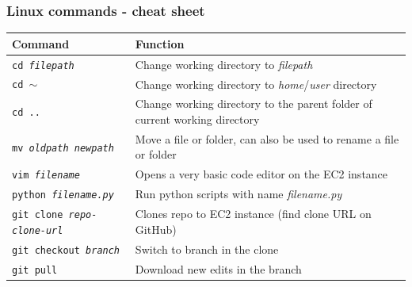 \documentclass[aspectratio=169]{beamer} %
\begin{document}
\begin{frame}
	\frametitle{Linux commands - cheat sheet}
	\vspace{-.6cm}
	\begin{table}
		\begin{tabular}{p{}p{}}
			Command & Function \\
			\hline \hline
			\texttt{cd \textit{filepath}}
			  & Change working directory to \textit{filepath}  \\
			\texttt{cd $\sim$}
			  & Change working directory to \textit{home}/\textit{user} directory \\
			\texttt{cd ..}
			  & Change working directory to the parent folder of current working directory \\
			\texttt{mv \textit{oldpath} \textit{newpath}}
			  & Move a file or folder, can also be used to rename a file or folder \\
			\texttt{vim \textit{filename}}
			  & Opens a very basic code editor on the EC2 instance \\
			\texttt{python \textit{filename.py}}
			  & Run python scripts with name \textit{filename.py} \\
			\texttt{git clone \textit{repo-clone-url}}
			  & Clones repo to EC2 instance (find clone URL on GitHub) \\
			\texttt{git checkout \textit{branch}}
			  & Switch to branch in the clone\\
			\texttt{git pull}
			  & Download new edits in the branch  \\
		\end{tabular}
	\end{table}
\end{frame}
\end{document}
